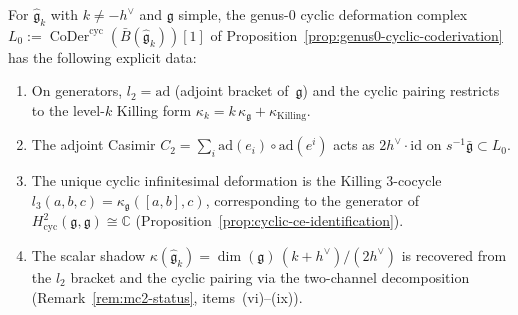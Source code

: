 \begin{corollary}\label{cor:km-cyclic-deformation}
For $\widehat{\mathfrak{g}}_k$ with $k\neq -h^\vee$ and
$\mathfrak{g}$ simple, the genus-$0$ cyclic deformation complex
$L_0 := \operatorname{CoDer}^{\mathrm{cyc}}(\bar{B}
(\widehat{\mathfrak{g}}_k))[1]$
of Proposition~\textup{\ref{prop:genus0-cyclic-coderivation}}
has the following explicit data:
\begin{enumerate}[label=\textup{(\roman*)}]
\item On generators, $l_2 = \mathrm{ad}$ \textup{(}adjoint
 bracket of~$\mathfrak{g}$\textup{)} and the cyclic pairing
 restricts to the level-$k$ Killing form
 $\kappa_k = k\,\kappa_{\mathfrak{g}} + \kappa_{\mathrm{Killing}}$.
\item The adjoint Casimir
 $C_2 = \sum_i \mathrm{ad}(e_i)\circ\mathrm{ad}(e^i)$
 acts as $2h^\vee\cdot\mathrm{id}$ on
 $s^{-1}\bar{\mathfrak{g}} \subset L_0$.
\item The unique cyclic infinitesimal deformation is
 the Killing $3$-cocycle
 $l_3(a,b,c) = \kappa_{\mathfrak{g}}([a,b],c)$, corresponding to the
 generator of $H^2_{\mathrm{cyc}}(\mathfrak{g},\mathfrak{g})
 \cong\mathbb{C}$
 \textup{(}Proposition~\textup{\ref{prop:cyclic-ce-identification}}\textup{)}.
\item The scalar shadow
 $\kappa(\widehat{\mathfrak{g}}_k) =
 \dim(\mathfrak{g})\,(k+h^\vee)/(2h^\vee)$
 is recovered from the $l_2$ bracket and the cyclic pairing via
 the two-channel decomposition
 \textup{(}Remark~\textup{\ref{rem:mc2-status}},
 items~\textup{(vi)--(ix)}\textup{)}.
\end{enumerate}
\end{corollary}

